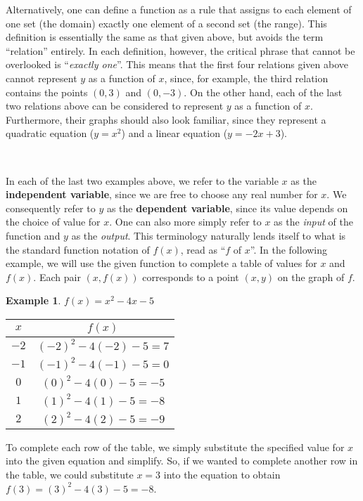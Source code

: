 \documentclass[11pt]{book}
\theoremstyle{definition}  %
\newtheorem{example}{Example}[chapter]
\newcommand{\pp}{\par~\par}
\begin{document}
Alternatively, one can define a function as a rule that assigns to each element of one set (the domain) exactly one element of a second set (the range).  This definition is essentially the same as that given above, but avoids the term ``relation'' entirely.  In each definition, however, the critical phrase that cannot be overlooked is ``\textit{exactly one}''.  This means that the first four relations given above cannot represent $y$ as a function of $x$, since, for example, the third relation contains the points $(0,3)$ and $(0,-3)$.  On the other hand, each of the last two relations above can be considered to represent $y$ as a function of $x$.  Furthermore, their graphs should also look familiar, since they represent a quadratic equation ($y=x^2$) and a linear equation ($y=-2x+3$).\pp
In each of the last two examples above, we refer to the variable $x$ as the {\bf independent variable}, since we are free to choose any real number for $x$.  We consequently refer to $y$ as the {\bf dependent variable}, since its value depends on the choice of value for $x$.  One can also more simply refer to $x$ as the \textit{input} of the function and $y$ as the \textit{output}.  This terminology naturally lends itself to what is the standard function notation of $f(x)$, read as ``$f$ of $x$''.  In the following example, we will use the given function to complete a table of values for $x$ and $f(x)$.  Each pair $(x,f(x))$ corresponds to a point $(x,y)$ on the graph of $f$.\par

\begin{example} $f(x)=x^2-4x-5$
\begin{center}
\begin{tabular}{c|c}
	$x$ & $f(x)$\\
	\hline
	$-2$ & $(-2)^2-4(-2)-5=7$\\
	\hline
	$-1$ & $(-1)^2-4(-1)-5=0$\\
	\hline
	$0$ & $(0)^2-4(0)-5=-5$\\
	\hline
	$1$ & $(1)^2-4(1)-5=-8$\\
	\hline
	$2$ & $(2)^2-4(2)-5=-9$
\end{tabular}
\end{center}
\end{example}

To complete each row of the table, we simply substitute the specified value for $x$ into the given equation and simplify.  So, if we wanted to complete another row in the table, we could substitute $x=3$ into the equation to obtain $f(3)=(3)^2-4(3)-5=-8$.
\newpage
\end{document}

